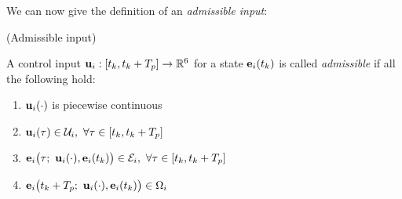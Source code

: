 We can now give the definition of an \textit{admissible input}:

\begin{bw_box}
\begin{definition} (Admissible input)\\[2.5ex]
  \label{definition:admissible_input}

  A control input $\bm{\mathbf{u}}_i : [t_k, t_k + T_p] \to \mathbb{R}^6$ for a state
  $\bm{\mathbf{e}}_i(t_k)$ is called \textit{admissible} if all the following hold:

  \begin{enumerate}
    \item $\bm{\mathbf{u}}_i(\cdot)$ is piecewise continuous
    \item $\vect{u}_i(\tau) \in \mathcal{U}_i,\ \forall \tau \in [t_k, t_k + T_p]$
    \item $\vect{e}_i\big(\tau;\ \vect{u}_i(\cdot), \vect{e}_i(t_k)\big) \in \mathcal{E}_i,\ \forall \tau \in [t_k, t_k + T_p]$
    \item $\vect{e}_i\big(t_k + T_p;\ \vect{u}_i(\cdot), \vect{e}_i(t_k)\big) \in \Omega_i$
  \end{enumerate}

\end{definition}
\end{bw_box}
